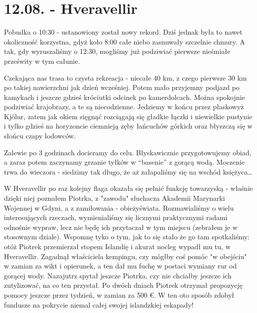 \chapter{12.08. - Hveravellir}

Pobudka o 10:30 - ustanowiony został nowy rekord. Dziś jednak była to nawet okoliczność korzystna, gdyż koło 8:00 całe niebo zasnuwały szczelnie chmury. A tak, gdy wyruszaliśmy o 12:30, mogliśmy już podziwiać pierwsze nieśmiałe prześwity w tym całunie.

Czekająca nas trasa to czysta rekreacja - niecałe 40 km, z czego pierwsze 30 km po takiej nawierzchni jak dzień wcześniej. Potem mało przyjemny podjazd po kamykach i jeszcze gdzieś króciutki odcinek po kamerdolcach. Można spokojnie podziwiać krajobrazy, a te są niecodzienne. Jedziemy w końcu przez płaskowyż Kjölur, zatem jak okiem sięgnąć rozciągają się gładkie łączki i niewielkie pustynie i tylko gdzieś na horyzoncie ciemnieją zęby łańcuchów górkich oraz błyszczą się w słońcu czapy lodowców.

Zalewie po 3 godzinach docieramy do celu. Błyskawicznie przygotowujemy obiad, a zaraz potem  zaczynamy grzanie tyłków w “basenie” z gorącą wodą. Moczenie trwa do wieczora - siedzimy tak długo, że aż załapaliśmy się na wschód księżyca…

W Hveravellir po raz kolejny flaga okazała się pełnić funkcję towarzyską - właśnie dzięki niej poznałem Piotrka, z "zawodu" słuchacza Akademii Marynarki Wojennej w Gdyni, a z zamiłowania - obieżyświata. Rozmawialiśmy o wielu interesujących rzeczach, wymienialiśmy się licznymi praktycznymi radami odnośnie wypraw, lecz nie będę ich przytaczał w tym miejscu (zebrałem je w stosownym dziale). Wspomnę tyko o tym, jak to się stało że go tam spotkaliśmy: otóż Piotrek przemierzał stopem Islandię i akurat nocleg wypadł mu tu, w Hveravellir. Zagadnął właściciela kempingu, czy mógłby coś pomóc "w obejściu" w zamian za wikt i opierunek, a ten dał mu fuchę w postaci wymiany rur od gorącej wody. Nazajutrz spytał jeszcze Piotrka, czy nie chciałby jeszcze ich zutylizować, na co ten przystał. Po dwóch dniach Piotrek otrzymał propozycję pomocy jeszcze przez tydzień, w zamian za 500 €. W ten oto sposób zdobył fundusze na pokrycie niemal całej swojej islandzkiej eskapady!


